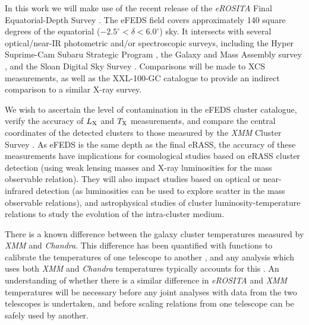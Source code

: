 \documentclass[fleqn,usenatbib]{mnras}
\begin{document}
In this work we will make use of the recent release of the {\em eROSITA} Final Equatorial-Depth Survey \citep[eFEDS,][]{efedscat}. The eFEDS field covers approximately 140 square degrees of the equatorial ($-2.5^{\circ}<\delta<6.0^{\circ}$) sky. It intersects with several optical/near-IR photometric and/or spectroscopic surveys, including the Hyper Suprime-Cam Subaru Strategic Program \citep[HSC SSP, ][]{hscsurvey}, the Galaxy and Mass Assembly survey \citep[GAMA, ][]{gamasurvey}, and the Sloan Digital Sky Survey \citep[SDSS, ][]{sdss}.  Comparisons will be made to XCS measurements, as well as the XXL-100-GC catalogue \citep[][]{xxlgc100} to provide an indirect comparison to a similar X-ray survey.

We wish to ascertain the level of contamination in the eFEDS cluster catalogue, verify the accuracy of $L_{\rm{X}}$ and $T_{\rm{X}}$ measurements, and compare the central coordinates of the detected clusters to those measured by the {\em XMM} Cluster Survey \citep[XCS, ][]{xcsfoundation}. 
As eFEDS is the same depth as the final eRASS, the accuracy of these measurements have implications for cosmological studies based on eRASS cluster detection (using weak lensing masses and X-ray luminosities for the mass observable relation). They will also impact studies based on optical or near-infrared detection (as luminosities can be used to explore scatter in the mass observable relations), and astrophysical studies of cluster luminosity-temperature relations to study the evolution of the intra-cluster medium. 

There is a known difference between the galaxy cluster temperatures measured by {\em XMM} and {\em Chandra}. This difference has been quantified with functions to calibrate the temperatures of one telescope to another \citep[][]{xmmchandracal}, and any analysis which uses both {\em XMM} and {\em Chandra} temperatures typically accounts for this \citep[][]{farahixmmchandra,mikgasxmmchandra}. An understanding of whether there is a similar difference in {\em eROSITA} and {\em XMM} temperatures will be necessary before any joint analyses with data from the two telescopes is undertaken, and before scaling relations from one telescope can be safely used by another. 

\end{document}
